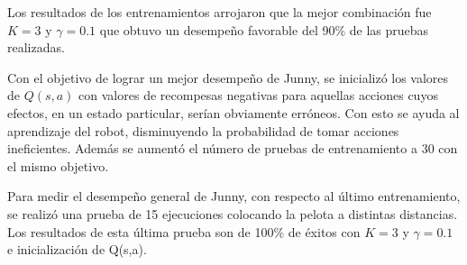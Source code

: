 %
%
%
%

Los resultados de los entrenamientos arrojaron que la mejor combinaci\'on fue $K = 3$ y $ \gamma = 0.1 $ que obtuvo un desempeño favorable del 90\% de las pruebas realizadas.

Con el objetivo de lograr un mejor desempeño de Junny, se inicializ\'o los valores de $Q(s,a)$ con valores de recompesas negativas para aquellas acciones cuyos efectos, en un estado particular, serían obviamente err\'oneos. Con esto se ayuda al aprendizaje del robot, disminuyendo la probabilidad de tomar acciones ineficientes. Adem\'as se aumentó el n\'umero de pruebas de entrenamiento a 30 con el mismo objetivo.

Para medir el desempeño general de Junny, con respecto al último entrenamiento, se realizó una prueba de 15 ejecuciones colocando la pelota a distintas distancias. Los resultados de esta \'ultima prueba  son de 100\% de éxitos con $K = 3$ y $ \gamma = 0.1 $ e inicializaci\'on de Q(s,a). %
%

